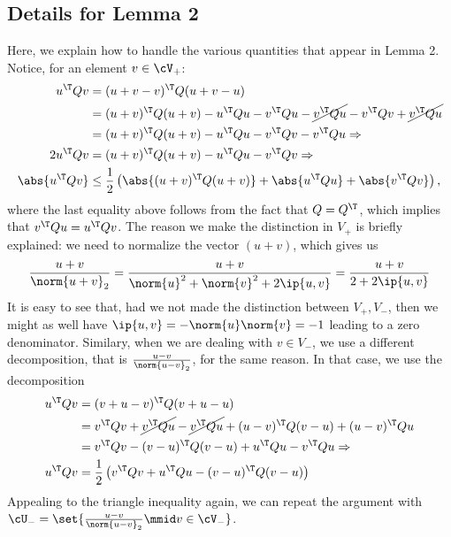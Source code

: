 \documentclass[a4paper]{article}
\begin{document}
\subsection*{Details for Lemma 2}
Here, we explain how to handle the various quantities that appear in Lemma 2.
Notice, for an element $v \in \cV_+$:
\begin{align*}
	u^\T Q v &= (u + v - v)^\T Q (u + v - u) \\
		&= (u + v)^\T Q (u + v) - u^\T Q u - v^\T Q u
		 - \cancel{v^\T Q u} - v^\T Q v + \cancel{v^\T Q u} \\
		&= (u + v)^\T Q (u + v) - u^\T Q u - v^\T Q v - v^\T Q u \Rightarrow \\
	2 u^\T Q v &= (u + v)^\T Q (u + v) - u^\T Q u - v^\T Q v \Rightarrow \\
	\abs{u^\T Q v} &\leq \frac{1}{2} \left(
		\abs{(u + v)^\T Q (u + v)} + \abs{u^\T Q u} + \abs{v^\T Q v}
	\right),
\end{align*}
where the last equality above follows from the fact that $Q = Q^\T$, which
implies that $v^\T Q u = u^\T Q v$. The reason we make the distinction in $V_+$
is briefly explained: we need to normalize the vector $(u + v)$, which gives us
\[
	\frac{u + v}{\norm{u + v}_2} =
	\frac{u + v}{\norm{u}^2 + \norm{v}^2 + 2 \ip{u, v}} =
	\frac{u + v}{2 + 2 \ip{u, v}}
\]
It is easy to see that, had we not made the distinction between $V_+, V_-$,
then we might as well have $\ip{u, v} = -\norm{u} \norm{v} = -1$ leading to a
zero denominator. Similary, when we are dealing with $v \in V_-$, we use a
different decomposition, that is $\frac{u - v}{\norm{u - v}_2}$, for the same
reason. In that case, we use the decomposition
\begin{align*}
    u^\T Q v &= (v + u - v)^\T Q (v + u - u) \\
        &= v^\T Q v + \cancel{v^\T Q u} - \cancel{v^\T Q u} + (u - v)^\T Q (v -
        u) + (u - v)^\T Q u \\
        &= v^\T Q v - (v - u)^\T Q (v - u) + u^\T Q u - v^\T Q u \Rightarrow \\
    u^\T Q v &= \frac{1}{2} \left(
        v^\T Q v + u^\T Q u - (v - u)^\T Q (v - u)
    \right)
\end{align*}
Appealing to the triangle inequality again, we can repeat the argument with
$\cU_- = \set{\frac{u - v}{\norm{u - v}_2} \mmid v \in \cV_-}$.
\end{document}
